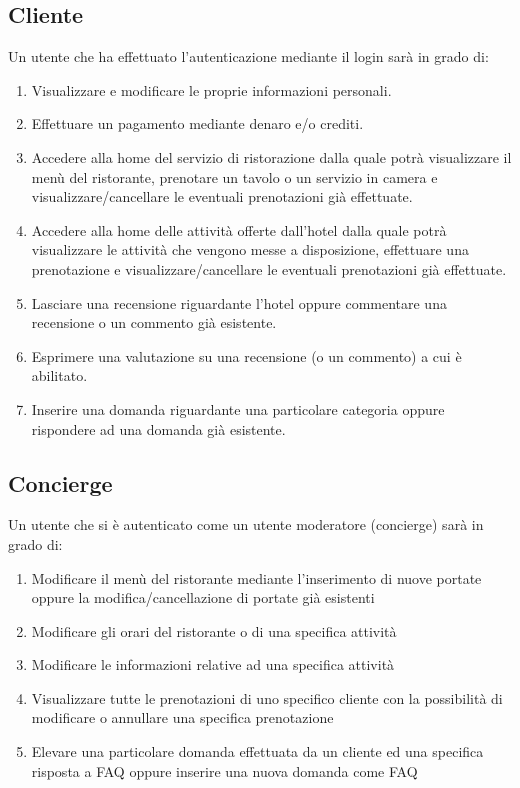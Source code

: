 \documentclass [a4paper, 12pt]{book}
\begin{document}
\medskip

\subsection{Cliente}
Un utente che ha effettuato l'autenticazione mediante il login sarà in grado di:
\begin{enumerate}
\item Visualizzare e modificare le proprie informazioni personali.
\item Effettuare un pagamento mediante denaro e/o crediti.
\item Accedere alla home del servizio di ristorazione dalla quale potrà visualizzare il menù del ristorante, prenotare un tavolo o un servizio in camera e visualizzare/cancellare le eventuali prenotazioni già effettuate.
\item Accedere alla home delle attività offerte dall'hotel dalla quale potrà visualizzare le attività che vengono messe a disposizione, effettuare una prenotazione e visualizzare/cancellare le eventuali prenotazioni già effettuate.
\item Lasciare una recensione riguardante l'hotel oppure commentare una recensione o un commento già esistente.
\item Esprimere una valutazione su una recensione (o un commento) a cui è abilitato.
\item Inserire una domanda riguardante una particolare categoria oppure rispondere ad una domanda già esistente.
\end{enumerate}

\medskip

\subsection{Concierge}
Un utente che si è autenticato come un utente moderatore (concierge) sarà in grado di:
\begin{enumerate}
\item Modificare il menù del ristorante mediante l'inserimento di nuove portate oppure la modifica/cancellazione di portate già esistenti
\item Modificare gli orari del ristorante o di una specifica attività
\item Modificare le informazioni relative ad una specifica attività
\item Visualizzare tutte le prenotazioni di uno specifico cliente con la possibilità di modificare o annullare una specifica prenotazione
\item Elevare una particolare domanda effettuata da un cliente ed una specifica risposta a FAQ oppure inserire una nuova domanda come FAQ
\end{enumerate}
\end{document}
